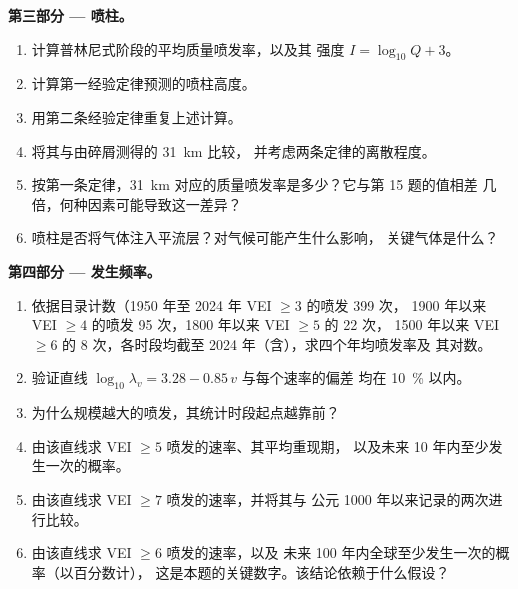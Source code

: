 \begin{problem}
\noindent\textbf{第三部分 --- 喷柱。}
\begin{enumerate}[resume]
\item 计算普林尼式阶段的平均质量喷发率，以及其
强度 $I = \log_{10}Q + 3$。
\item 计算第一经验定律预测的喷柱高度。
\item 用第二条经验定律重复上述计算。
\item 将其与由碎屑测得的 \qty{31}{km} 比较，
并考虑两条定律的离散程度。
\item 按第一条定律，\qty{31}{km} 对应的质量喷发率是多少？它与第 15 题的值相差
几倍，何种因素可能导致这一差异？
\item 喷柱是否将气体注入平流层？对气候可能产生什么影响，
关键气体是什么？
\end{enumerate}

\noindent\textbf{第四部分 --- 发生频率。}
\begin{enumerate}[resume]
\item 依据目录计数（1950 年至 2024 年 VEI $\ge 3$ 的喷发 399 次，
1900 年以来 VEI $\ge 4$ 的喷发 95 次，1800 年以来 VEI $\ge 5$ 的 22 次，
1500 年以来 VEI $\ge 6$ 的 8 次，各时段均截至 2024 年（含），求四个年均喷发率及
其对数。
\item 验证直线 $\log_{10}\lambda_v = 3.28 - 0.85\,v$ 与每个速率的偏差
均在 \qty{10}{\percent} 以内。
\item 为什么规模越大的喷发，其统计时段起点越靠前？
\item 由该直线求 VEI $\ge 5$ 喷发的速率、其平均重现期，
以及未来 10 年内至少发生一次的概率。
\item 由该直线求 VEI $\ge 7$ 喷发的速率，并将其与
公元 1000 年以来记录的两次进行比较。
\item 由该直线求 VEI $\ge 6$ 喷发的速率，以及
未来 100 年内全球至少发生一次的概率（以百分数计），
这是本题的关键数字。该结论依赖于什么假设？
\end{enumerate}
\end{problem}
